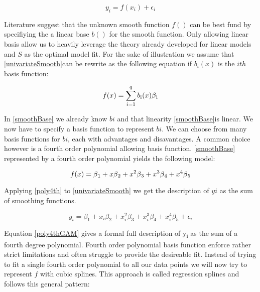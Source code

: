 \documentclass{article}
\begin{document}
    \begin{equation} \label{univariateSmooth} y_i = f(x_i) + \epsilon_i \end{equation}

    Literature suggest that the unknown smooth function $f()$ can be best fund by specifiying the a linear base $b()$ for the smooth function. Only allowing linear basis allow us to heavily leverage the theory already developed for linear models and $S$ as the optimal model fit. For the sake of illustration we assume that \ref{univariateSmooth}can be rewrite as the following equation if $b_i(x)$ is the $ith$ basis function:

    \begin{equation} \label{smoothBase} f(x) = \sum_{i=1}^{q} b\textsubscript{i} (x) \beta \textsubscript{i} \end{equation}

    In \ref{smoothBase} we already know $bi$ and that linearity \ref{smoothBase}is linear. We now have to specify a basis function to represent $bi$. We can choose from many basis functions for $bi$, each with advantages and disavantages. A common choice however is a fourth order polynomial allowing basis function. \ref{smoothBase} represented by a fourth order polynomial yields the following model:

    \begin{equation} \label{poly4th} f(x) = \beta \textsubscript{1} + x\beta \textsubscript{2} + x^2\beta \textsubscript{3} + x^3\beta \textsubscript{4} + x^4\beta \textsubscript{5}  \end{equation}

    Applying \ref{poly4th} to \ref{univariateSmooth} we get the description of $yi$ as the sum of smoothing functions.

    \begin{equation} \label{poly4thGAM}  y_i = \beta_1 + x_i\beta_2 + x_i^2\beta_3+ x_i^3\beta_4 + x_i^4\beta_5 + \epsilon_i \end{equation}

    Equation \ref{poly4thGAM} gives a formal full description of  y\textsubscript{i} as the sum of a fourth degree polynomial. Fourth order polynomial basis function enforce rather strict limitations and often struggle to provide the desireable fit. Instead of trying to fit a single fourth order polynomial to all our data points we will now try to represent $f$ with cubic splines. This approach is called regression splines and follows this general pattern:
\end{document}
